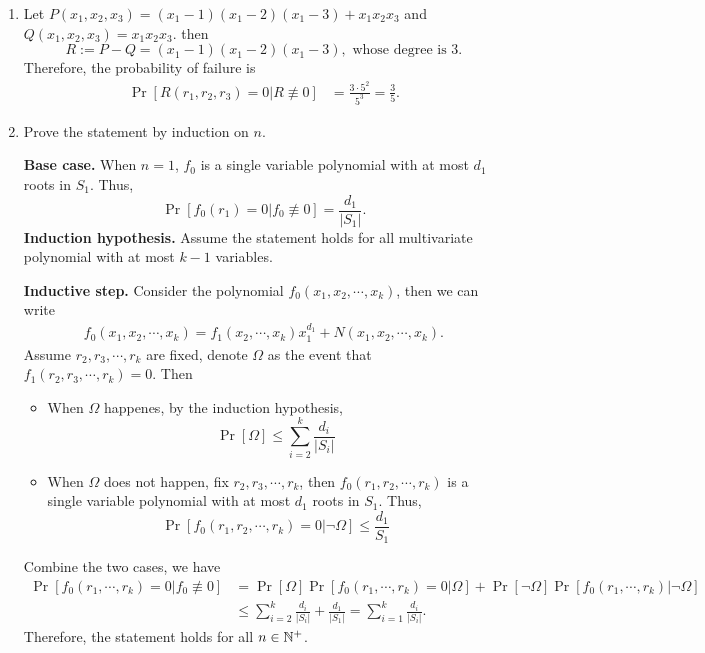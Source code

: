 \begin{answer}
    \begin{enumerate}[label = \alph*).]
        \item Let $P(x_1,x_2,x_3) = (x_1-1)(x_1-2)(x_1-3) + x_1x_2x_3$ and $Q(x_1,x_2,x_3) = x_1x_2x_3$. 
        then 
        \[
            R:= P-Q = (x_1-1)(x_1-2)(x_1-3), \text{ whose degree is $3$}. 
        \]
        Therefore, the probability of failure is
        \begin{align*}
            \Pr[R(r_1,r_2,r_3) = 0 | R \not\equiv 0] &= \frac{3\cdot 5^2}{5^3} = \frac{3}{5}.
        \end{align*}
        \item Prove the statement by induction on $n$. 
        
        \textbf{Base case.} When $n=1$, $f_0$ is a single variable polynomial with at most $d_1$ roots in $S_1$. Thus, 
        \[
            \Pr[f_0(r_1) = 0 | f_0 \not\equiv 0] = \frac{d_1}{|S_1|}.
        \]
        \textbf{Induction hypothesis.} Assume the statement holds for all multivariate polynomial with at most $k-1$ variables.
        
        \textbf{Inductive step.} Consider the polynomial $f_0(x_1,x_2,\cdots,x_k)$, then we can write
        \begin{align*}
            f_0(x_1,x_2,\cdots,x_k) = f_1(x_2,\cdots,x_k)x_1^{d_1} + N(x_1, x_2, \cdots, x_k).
        \end{align*}
        Assume $r_2, r_3, \cdots, r_k$ are fixed, denote $\Omega$ as the event that $f_1(r_2, r_3, \cdots, r_k) = 0$. Then
        \begin{itemize}
            \item  When $\Omega$ happenes, by the induction hypothesis, 
            \[
                \Pr[\Omega] \leq \sum_{i=2}^k \frac{d_i}{|S_i|}
            \]
            \item When $\Omega$ does not happen, fix $r_2, r_3, \cdots, r_k$, then $f_0(r_1, r_2, \cdots, r_k)$ is a single variable polynomial with at most $d_1$ roots in $S_1$. Thus,
            \[
                \Pr[f_0(r_1, r_2, \cdots, r_k) = 0 | \neg \Omega] \le \frac{d_1}{S_1}
            \]
        \end{itemize}
        Combine the two cases, we have
        \begin{align*}
            \Pr[f_0(r_1, \cdots, r_k) = 0 | f_0 \not\equiv 0] &= \Pr[\Omega]\Pr[f_0(r_1, \cdots, r_k) = 0 | \Omega] + \Pr[\neg \Omega]\Pr[f_0(r_1,\cdots, r_k) | \neg \Omega] \\
            &\le \sum_{i=2}^k \frac{d_i}{|S_i|} + \frac{d_1}{|S_1|} = \sum_{i=1}^k \frac{d_i}{|S_i|}.
        \end{align*}
        Therefore, the statement holds for all $n \in \mathbb{N}^+$.
    \end{enumerate}
    \ed
\end{answer}
